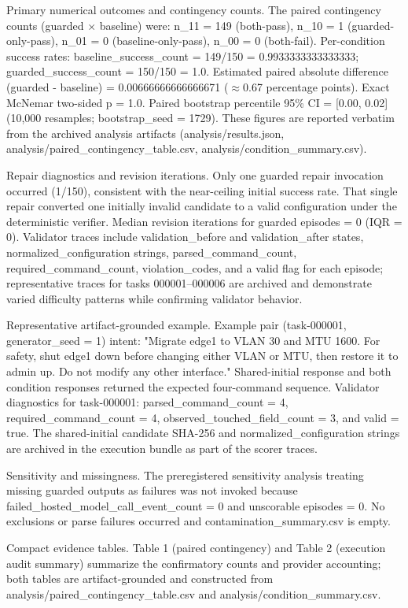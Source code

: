 \documentclass[conference]{IEEEtran}
\begin{document}
Primary numerical outcomes and contingency counts. The paired contingency counts (guarded \ensuremath{\times} baseline) were: n\_11 = 149 (both-pass), n\_10 = 1 (guarded-only-pass), n\_01 = 0 (baseline-only-pass), n\_00 = 0 (both-fail). Per-condition success rates: baseline\_success\_count = 149/150 = 0.9933333333333333; guarded\_success\_count = 150/150 = 1.0. Estimated paired absolute difference (guarded - baseline) = 0.00666666666666671 (\ensuremath{\approx}0.67 percentage points). Exact McNemar two-sided p = 1.0. Paired bootstrap percentile 95\% CI = [0.00, 0.02] (10,000 resamples; bootstrap\_seed = 1729). These figures are reported verbatim from the archived analysis artifacts (analysis/results.json, analysis/paired\_contingency\_table.csv, analysis/condition\_summary.csv).

Repair diagnostics and revision iterations. Only one guarded repair invocation occurred (1/150), consistent with the near-ceiling initial success rate. That single repair converted one initially invalid candidate to a valid configuration under the deterministic verifier. Median revision iterations for guarded episodes = 0 (IQR = 0). Validator traces include validation\_before and validation\_after states, normalized\_configuration strings, parsed\_command\_count, required\_command\_count, violation\_codes, and a valid flag for each episode; representative traces for tasks 000001--000006 are archived and demonstrate varied difficulty patterns while confirming validator behavior.

Representative artifact-grounded example. Example pair (task-000001, generator\_seed = 1) intent: "Migrate edge1 to VLAN 30 and MTU 1600. For safety, shut edge1 down before changing either VLAN or MTU, then restore it to admin up. Do not modify any other interface." Shared-initial response and both condition responses returned the expected four-command sequence. Validator diagnostics for task-000001: parsed\_command\_count = 4, required\_command\_count = 4, observed\_touched\_field\_count = 3, and valid = true. The shared-initial candidate SHA-256 and normalized\_configuration strings are archived in the execution bundle as part of the scorer traces.

Sensitivity and missingness. The preregistered sensitivity analysis treating missing guarded outputs as failures was not invoked because failed\_hosted\_model\_call\_event\_count = 0 and unscorable episodes = 0. No exclusions or parse failures occurred and contamination\_summary.csv is empty.

Compact evidence tables. Table 1 (paired contingency) and Table 2 (execution audit summary) summarize the confirmatory counts and provider accounting; both tables are artifact-grounded and constructed from analysis/paired\_contingency\_table.csv and analysis/condition\_summary.csv.
\end{document}
